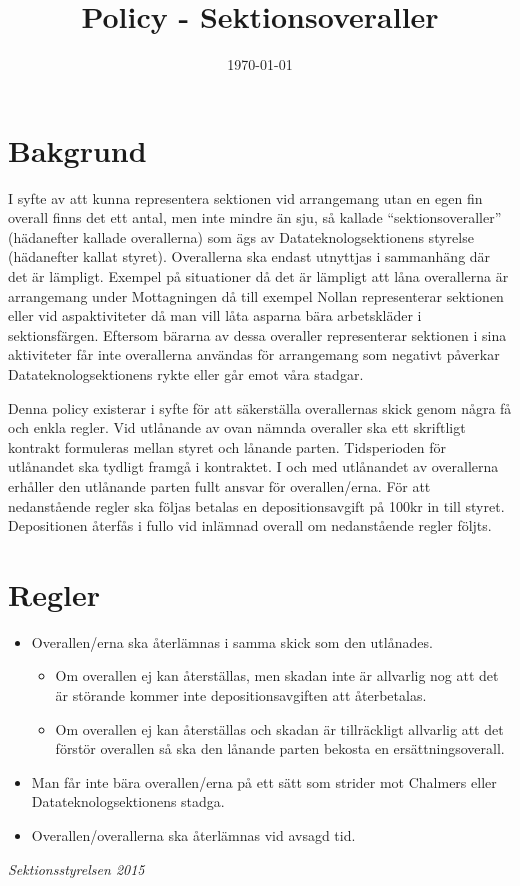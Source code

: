 \documentclass{dtek}
\title{Policy - Sektionsoveraller}
\date{\today} %
\begin{document}
\makeheadfoot
\maketitle

\section{Bakgrund}
I syfte av att kunna representera sektionen vid arrangemang utan en egen fin overall finns det ett antal, men inte mindre än sju, så kallade ``sektionsoveraller'' (hädanefter kallade overallerna) som ägs av Datateknologsektionens styrelse (hädanefter kallat styret). Overallerna ska endast utnyttjas i sammanhäng där det är lämpligt.
Exempel på situationer då det är lämpligt att låna overallerna är arrangemang under Mottagningen då till exempel Nollan representerar sektionen eller vid aspaktiviteter då man vill låta asparna bära arbetskläder i sektionsfärgen.
Eftersom bärarna av dessa overaller representerar sektionen i sina aktiviteter får inte overallerna användas för arrangemang som negativt påverkar Datateknologsektionens rykte eller går emot våra stadgar.

Denna policy existerar i syfte för att säkerställa overallernas skick genom några få och enkla regler.
Vid utlånande av ovan nämnda overaller ska ett skriftligt kontrakt formuleras mellan styret och lånande parten. Tidsperioden för utlånandet ska tydligt framgå i kontraktet. I och med utlånandet av overallerna erhåller den utlånande parten fullt ansvar för overallen/erna. För att nedanstående regler ska följas betalas en depositionsavgift på 100kr in till styret. Depositionen återfås i fullo vid inlämnad overall om nedanstående regler följts.

\section{Regler}
\begin{itemize}
\item Overallen/erna ska återlämnas i samma skick som den utlånades.
  \begin{itemize}
  \item Om overallen ej kan återställas, men skadan inte är allvarlig nog att det är störande kommer inte depositionsavgiften att återbetalas.
  \item Om overallen ej kan återställas och skadan är tillräckligt allvarlig att det förstör overallen så ska den lånande parten bekosta en ersättningsoverall.
  \end{itemize}
\item Man får inte bära overallen/erna på ett sätt som strider mot Chalmers eller Datateknologsektionens stadga.
\item Overallen/overallerna ska återlämnas vid avsagd tid.
\end{itemize}

\vspace{1cm}

\emph{Sektionsstyrelsen 2015}
\end{document}
